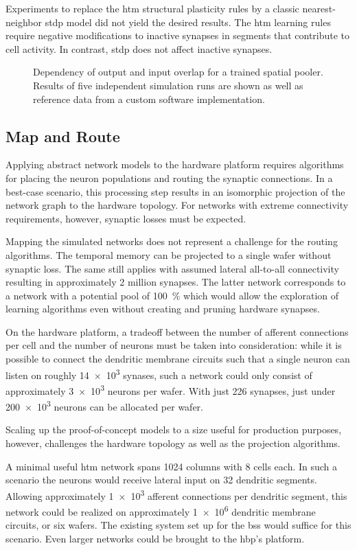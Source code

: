 Experiments to replace the \gls{htm} structural plasticity rules by a classic
nearest-neighbor \gls{stdp} model did not yield the desired results. The
\gls{htm} learning rules require negative modifications to inactive synapses in
segments that contribute to cell activity. In contrast, \gls{stdp} does not
affect inactive synapses.


\begin{figure}
	\begin{center}
		
	\end{center}
	\caption{Dependency of output and input overlap for a trained spatial pooler. Results of five independent simulation runs are shown as well as reference data from a custom software implementation.}
	\label{fig:spatial_pooler_learning}
\end{figure}

\subsection{Map and Route}

Applying abstract network models to the hardware platform requires algorithms for placing the neuron populations and routing the synaptic connections. In a best-case scenario, this processing step results in an isomorphic projection of the network graph to the hardware topology. For networks with extreme connectivity requirements, however, synaptic losses must be expected.

Mapping the simulated networks does not represent a challenge for the routing algorithms. The temporal memory can be projected to a single wafer without synaptic loss. The same still applies with assumed lateral all-to-all connectivity resulting in approximately 2 million synapses. The latter network corresponds to a network with a potential pool of \SI{100}{\%} which would allow the exploration of learning algorithms even without creating and pruning hardware synapses.

On the hardware platform, a tradeoff between the number of afferent connections
per cell and the number of neurons must be taken into consideration: while it is
possible to connect the dendritic membrane circuits such that a single neuron
can listen on roughly \num{14e3} synases, such a network could only consist of
approximately \num{3e3} neurons per wafer. With just 226 synapses, just under
\num{200e3} neurons can be allocated per wafer.

Scaling up the proof-of-concept models to a size useful for production purposes, however, challenges the hardware topology as well as the projection algorithms.

A minimal useful \gls{htm} network spans 1024 columns with 8 cells each. In such
a scenario the neurons would receive lateral input on 32 dendritic segments.
Allowing approximately \num{1e3} afferent connections per dendritic segment,
this network could be realized on approximately \num{1e6} dendritic membrane
circuits, or six wafers. The existing system set up for the \gls{bss} would
suffice for this scenario. Even larger networks could be brought to the
\gls{hbp}'s platform.
